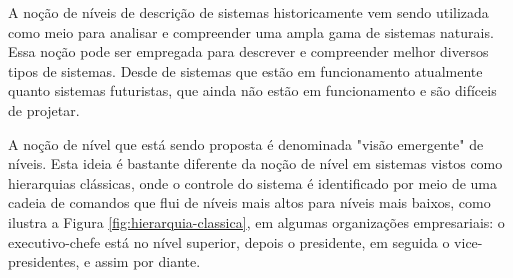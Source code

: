     
    A noção de níveis de descrição de sistemas historicamente vem sendo utilizada como meio para analisar e compreender uma ampla gama de sistemas naturais. Essa noção pode ser empregada para descrever e compreender melhor diversos tipos de sistemas. Desde de sistemas que estão em funcionamento atualmente quanto sistemas futuristas, que ainda não estão em funcionamento e são difíceis de projetar.
    
    
    A noção de nível que está sendo proposta é denominada "visão emergente" de níveis. Esta ideia é bastante diferente da noção de nível em sistemas vistos como hierarquias clássicas, onde o controle do sistema é identificado por meio de uma cadeia de comandos que flui de níveis mais altos para níveis mais baixos, como ilustra a Figura \ref{fig:hierarquia-classica}, em algumas organizações empresariais: o executivo-chefe está no nível superior, depois o presidente, em seguida o vice-presidentes, e assim por diante.
    
    
    \begin{figure}[!ht]
        \centering
    \end{figure}
    
